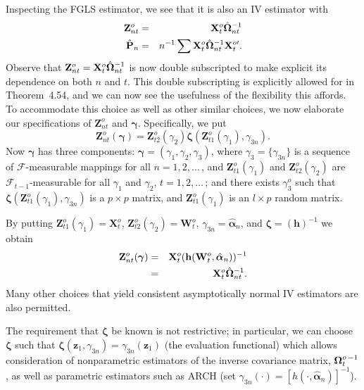 Inspecting the FGLS estimator, we see that it is also an IV estimator
with
\begin{eqnarray*}
\mathbf{Z}_{nt}^o &=& \mathbf{X}_t^o\hat{\boldsymbol{\Omega}}_{nt}^{-1}\\
\hat{\mathbf{P}}_n &=& n^{-1}\sum \mathbf{X}_t^o\hat{\boldsymbol{\Omega}}_{nt}^{-1}\mathbf{X}_t^{o\prime}.
\end{eqnarray*}
Observe that $\mathbf{Z}_{nt}^o = \mathbf{X}_t^o\hat{\boldsymbol{\Omega}}_{nt}^{-1}$ is now double subscripted to make explicit its
dependence on both $n$ and $t$. This double subscripting is explicitly allowed
for in Theorem~4.54, and we can now see the usefulness of the flexibility
this affords. To accommodate this choice as well as other similar choices,
we now elaborate our specifications of $\mathbf{Z}_{nt}^o$ and $\boldsymbol{\gamma}$. Specifically, we put
\[
\mathbf{Z}_{nt}^o(\boldsymbol{\gamma}) = \mathbf{Z}_{t2}^o(\gamma_2)\boldsymbol{\zeta}(\mathbf{Z}_{t1}^o(\gamma_1), \gamma_{3n}).
\]
Now $\boldsymbol{\gamma}$ has three components: $\boldsymbol{\gamma} = (\gamma_1, \gamma_2, \gamma_3)$, where $\gamma_3 = \{\gamma_{3n}\}$ is a sequence of $\mathcal{F}$-measurable mappings for all $n = 1, 2, \ldots$\,, and $\mathbf{Z}_{t1}^o(\gamma_1)$ and $\mathbf{Z}_{t2}^o(\gamma_2)$ are $\mathcal{F}_{t-1}$-measurable for all $\gamma_1$ and $\gamma_2$, $t = 1, 2, \ldots$\,; and there exists $\gamma_3^o$ such that
$\boldsymbol{\zeta}(\mathbf{Z}_{t1}^o(\gamma_1), \gamma_{3n})$ is a $p \times p$ matrix, and $\mathbf{Z}_{t1}^o(\gamma_1)$ is an $l \times p$ random matrix.

By putting $\mathbf{Z}_{t1}^o(\gamma_1) = \mathbf{X}_t^o$, $\mathbf{Z}_{t2}^o(\gamma_2) = \mathbf{W}_t^o$, $\gamma_{3n} = \hat{\boldsymbol{\alpha}}_n$, and $\boldsymbol{\zeta} = (\mathbf{h})^{-1}$ we
obtain
\begin{eqnarray*}
\mathbf{Z}_{nt}^o(\boldsymbol{\gamma}) &=& \mathbf{X}_t^o(\mathbf{h}(\mathbf{W}_t^o, \hat{\boldsymbol{\alpha}}_n))^{-1}\\
&=& \mathbf{X}_t^o\hat{\boldsymbol{\Omega}}_{nt}^{-1}.
\end{eqnarray*}
Many other choices that yield consistent asymptotically normal IV estimators are also permitted.

The requirement that $\boldsymbol{\zeta}$ be known is not restrictive; in particular, we can
choose $\boldsymbol{\zeta}$ such that $\boldsymbol{\zeta}(\mathbf{z}_1, \gamma_{3n}) = \gamma_{3n}(\mathbf{z}_1)$ (the evaluation functional) which
allows consideration of nonparametric estimators of the inverse covariance
matrix, $\boldsymbol{\Omega}_t^{o\,-1}$, as well as parametric estimators such as ARCH (set $\gamma_{3n}(\cdot) =
[h(\cdot, \hat{\boldsymbol{\alpha}}_n)]^{-1}$).


